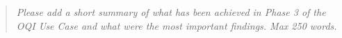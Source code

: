 \documentclass{oqireport}
\begin{document}

\maketitle

\begin{abstract}
    \textit{Please add a short summary of what has been achieved in Phase 3 of the OQI Use Case and what were the most important findings. Max 250 words.}
\end{abstract}
\end{document}
